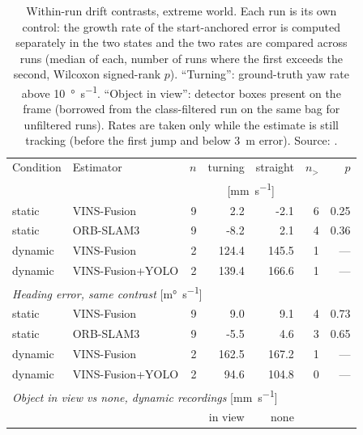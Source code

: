 \begin{table}[htbp]
\centering
\small
\caption[Within-run drift contrasts, extreme world.]{Within-run drift contrasts, extreme world. Each run is its own control: the growth rate of the start-anchored error is computed separately in the two states and the two rates are compared across runs (median of each, number of runs where the first exceeds the second, Wilcoxon signed-rank $p$). ``Turning'': ground-truth yaw rate above \SI{10}{\degree\per\second}. ``Object in view'': detector boxes present on the frame (borrowed from the class-filtered run on the same bag for unfiltered runs). Rates are taken only while the estimate is still tracking (before the first jump and below \SI{3}{\metre} error). Source: .}
\label{tab:insight-contrast-extreme}
\begin{tabular}{llrrrrr}
\toprule
Condition & Estimator & $n$ & turning & straight & $n_{>}$ & $p$ \\
 & & & \multicolumn{2}{c}{[\si{\milli\metre\per\second}]} & & \\
\midrule
static & VINS-Fusion & 9 & 2.2 & -2.1 & 6 & 0.25 \\
static & ORB-SLAM3 & 9 & -8.2 & 2.1 & 4 & 0.36 \\
dynamic & VINS-Fusion & 2 & 124.4 & 145.5 & 1 & --- \\
dynamic & VINS-Fusion+YOLO & 2 & 139.4 & 166.6 & 1 & --- \\
\midrule
\multicolumn{7}{l}{\emph{Heading error, same contrast} [\si{\milli\degree\per\second}]} \\
static & VINS-Fusion & 9 & 9.0 & 9.1 & 4 & 0.73 \\
static & ORB-SLAM3 & 9 & -5.5 & 4.6 & 3 & 0.65 \\
dynamic & VINS-Fusion & 2 & 162.5 & 167.2 & 1 & --- \\
dynamic & VINS-Fusion+YOLO & 2 & 94.6 & 104.8 & 0 & --- \\
\midrule
\multicolumn{7}{l}{\emph{Object in view vs none, dynamic recordings} [\si{\milli\metre\per\second}]} \\
 & & & in view & none & & \\
\bottomrule
\end{tabular}
\end{table}
